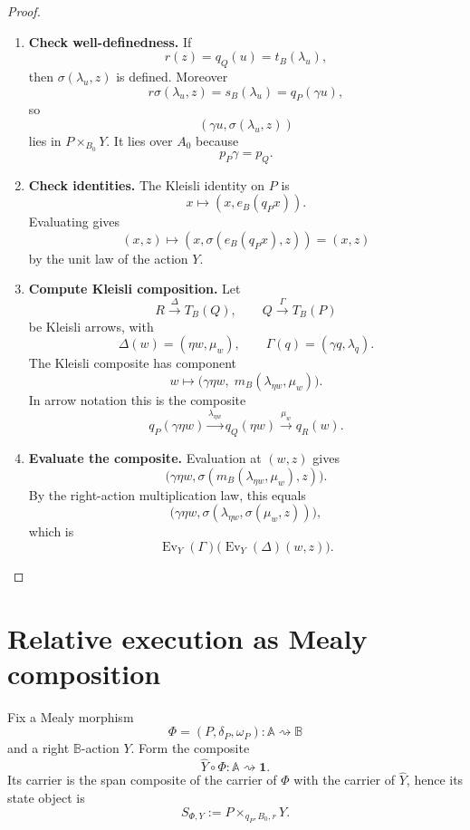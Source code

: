 \begin{proof}
\leavevmode
\begin{enumerate}
\item \textbf{Check well-definedness.}
If
\[
r(z)=q_Q(u)=t_B(\lambda_u),
\]
then \(\sigma(\lambda_u,z)\) is defined. Moreover
\[
r\sigma(\lambda_u,z)=s_B(\lambda_u)=q_P(\gamma u),
\]
so
\[
(\gamma u,\sigma(\lambda_u,z))
\]
lies in \(P\times_{B_0}Y\). It lies over \(A_0\) because
\[
p_P\gamma=p_Q.
\]

\item \textbf{Check identities.}
The Kleisli identity on \(P\) is
\[
x\longmapsto (x,e_B(q_Px)).
\]
Evaluating gives
\[
(x,z)\longmapsto
(x,\sigma(e_B(q_Px),z))
=
(x,z)
\]
by the unit law of the action \(Y\).

\item \textbf{Compute Kleisli composition.}
Let
\[
R\xrightarrow{\Delta}T_B(Q),
\qquad
Q\xrightarrow{\Gamma}T_B(P)
\]
be Kleisli arrows, with
\[
\Delta(w)=(\eta w,\mu_w),
\qquad
\Gamma(q)=(\gamma q,\lambda_q).
\]
The Kleisli composite has component
\[
w\longmapsto
\bigl(\gamma\eta w,\;m_B(\lambda_{\eta w},\mu_w)\bigr).
\]
In arrow notation this is the composite
\[
q_P(\gamma\eta w)
\xrightarrow{\lambda_{\eta w}}
q_Q(\eta w)
\xrightarrow{\mu_w}
q_R(w).
\]

\item \textbf{Evaluate the composite.}
Evaluation at \((w,z)\) gives
\[
\bigl(\gamma\eta w,
\sigma(m_B(\lambda_{\eta w},\mu_w),z)\bigr).
\]
By the right-action multiplication law, this equals
\[
\bigl(\gamma\eta w,
\sigma(\lambda_{\eta w},\sigma(\mu_w,z))\bigr),
\]
which is
\[
\operatorname{Ev}_Y(\Gamma)
\bigl(
\operatorname{Ev}_Y(\Delta)(w,z)
\bigr).
\]
\end{enumerate}
\end{proof}


\section{Relative execution as Mealy composition}
\label{sec:relative-execution-as-composition}

Fix a Mealy morphism
\[
    \Phi=(P,\delta_P,\omega_P):
    \mathbb A\rightsquigarrow\mathbb B
\]
and a right \(\mathbb B\)-action \(Y\).  Form the composite
\[
    \widehat Y\circ\Phi:
    \mathbb A\rightsquigarrow\mathbf 1.
\]
Its carrier is the span composite of the carrier of \(\Phi\) with the carrier
of \(\widehat Y\), hence its state object is
\[
    S_{\Phi,Y}
    :=
    P\times_{q_P,B_0,r}Y.
\]

